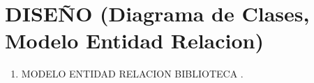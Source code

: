 \section{ DISEÑO (Diagrama de Clases, Modelo Entidad Relacion)} 

\begin{enumerate}[1.]
	\item MODELO ENTIDAD RELACION BIBLIOTECA .\\
	
    





	
	
\end{enumerate} 
